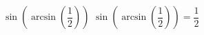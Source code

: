  {$\sin\left(\arcsin\left(\dfrac{1}{2}\right)\right)$ }
{ $\sin\left(\arcsin\left(\dfrac{1}{2}\right)\right) = \dfrac{1}{2}$ }
